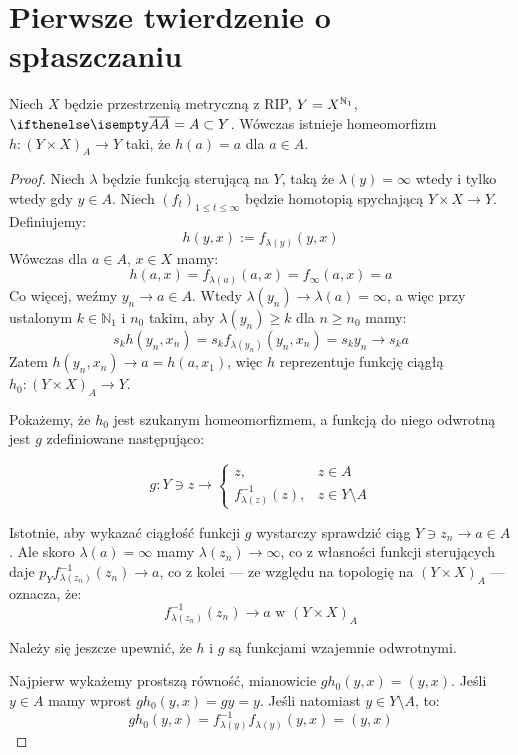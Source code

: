 \section{Pierwsze twierdzenie o spłaszczaniu}
\begin{thm}
  Niech $X$ będzie przestrzenią metryczną z RIP, $Y = X^{\mathbb{N}_1}$, $\cl A = A \subset Y$. Wówczas istnieje homeomorfizm $h: (Y \times X)_A \rightarrow Y$ taki, że $h(a) = a$ dla $a \in A$.
  
  \begin{proof}
    Niech $\lambda$ będzie funkcją sterującą na $Y$, taką że $\lambda(y) = \infty$ wtedy i tylko wtedy gdy $y \in A$.
    Niech $(f_t)_{1 \leq t \leq \infty}$ będzie homotopią spychającą $Y \times X \rightarrow Y$.
    Definiujemy:
    \[h(y,x) := f_{\lambda(y)}(y,x)\]
    Wówczas dla $a \in A$, $x \in X$ mamy:
    \[h(a,x) = f_{\lambda(a)}(a,x) = f_\infty(a,x) = a\]
    Co więcej, weźmy $y_n \rightarrow a \in A$. Wtedy $\lambda(y_n) \rightarrow \lambda(a) = \infty$, a więc przy ustalonym $k \in \mathbb{N}_1$ i $n_0$ takim, aby $\lambda(y_n) \geq k$ dla $n \geq n_0$ mamy:
    \[s_k h(y_n, x_n) = s_k f_{\lambda(y_n)}(y_n,x_n) = s_k y_n \rightarrow s_k a\]
    Zatem $h(y_n,x_n) \rightarrow a = h(a, x_1)$, więc $h$ reprezentuje funkcję ciągłą $h_0: (Y \times X)_A \rightarrow Y$.
    
    Pokażemy, że $h_0$ jest szukanym homeomorfizmem, a funkcją do niego odwrotną jest $g$ zdefiniowane następująco:
    
    \[g: Y \ni z \rightarrow
    \begin{cases}
      z,& z\in A \\
      f^{-1}_{\lambda(z)}(z),& z \in Y \setminus A
    \end{cases}\]
    
    Istotnie, aby wykazać ciągłość funkcji $g$ wystarczy sprawdzić ciąg $Y \ni z_n \rightarrow a \in A$. Ale skoro $\lambda(a) = \infty$ mamy $\lambda(z_n) \rightarrow \infty$, co z własności funkcji sterujących daje $p_Y f_{\lambda(z_n)}^{-1}(z_n) \rightarrow a$, co z kolei --- ze względu na topologię na $(Y \times X)_A$ --- oznacza, że:
    \[f_{\lambda(z_n)}^{-1}(z_n) \rightarrow a \mbox{ w } (Y \times X)_A\]

    Należy się jeszcze upewnić, że $h$ i $g$ są funkcjami wzajemnie odwrotnymi.
    
    Najpierw wykażemy prostszą równość, mianowicie $gh_0(y,x) = (y,x)$. Jeśli $y \in A$ mamy wprost $gh_0(y,x) = gy = y$. Jeśli natomiast $y \in Y \setminus A$, to:
    \[gh_0(y,x) = f^{-1}_{\lambda(y)} f_{\lambda(y)}(y,x) = (y,x)\]
    

\end{proof}
\end{thm}
